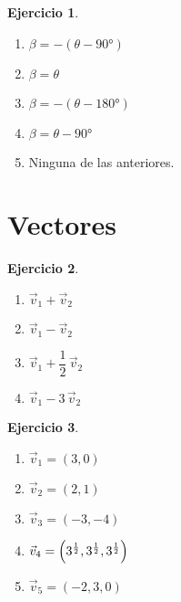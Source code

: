 \documentclass[a4paper,12pt,twoside]{book}
\newtheorem{ejercicio}{{Ejercicio}}[chapter]
\begin{document}
\begin{mdframed}[style=ejercicio-facil]
    \begin{ejercicio}
    \end{ejercicio}
    \begin{center}
        \def\svgwidth{0.2\linewidth}
        
    \end{center}
    \begin{enumerate}
        \item $\beta = -(\theta-\ang{90})$
        \item $\beta = \theta$
        \item $\beta = -(\theta-\ang{180})$
        \item $\beta = \theta-\ang{90}$
        \item Ninguna de las anteriores.
    \end{enumerate}
\end{mdframed}


\section{Vectores}

\begin{mdframed}[style=ejercicio-facil]
    \begin{ejercicio}
    \end{ejercicio}
    \begin{enumerate}
        \item $\vec{v}_1 + \vec{v}_2$
        \item $\vec{v}_1 - \vec{v}_2$
        \item $\vec{v}_1 + \dfrac{1}{2} \, \vec{v}_2$
        \item $\vec{v}_1 - 3 \, \vec{v}_2$
    \end{enumerate}
\end{mdframed}

\begin{mdframed}[style=ejercicio-facil]
    \begin{ejercicio}
    \end{ejercicio}
    \begin{enumerate}
        \item $\vec{v}_1 = (3,0)$
        \item $\vec{v}_2 = (2,1)$
        \item $\vec{v}_3 = (-3,-4)$
        \item $\vec{v}_4 = \left(3^{\frac{1}{2}},3^{\frac{1}{2}},3^{\frac{1}{2}}\right)$
        \item $\vec{v}_5 = (-2,3,0)$
    \end{enumerate}
\end{mdframed}
\end{document}
